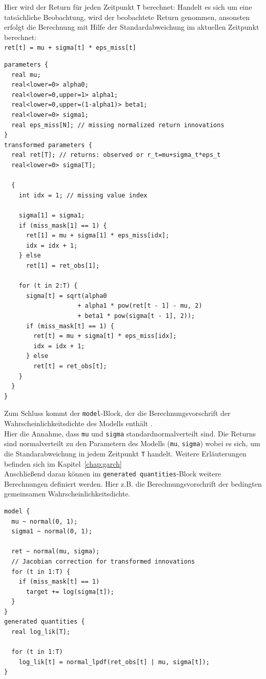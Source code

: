 \documentclass[ngerman]{ttlab-qualify}
\begin{document}
Hier wird der Return für jeden Zeitpunkt \verb|T| berechnet: Handelt es sich um eine tatsächliche Beobachtung, wird der beobachtete Return genommen, ansonsten erfolgt die Berechnung mit Hilfe der Standardabweichung im aktuellen Zeitpunkt berechnet:\\
\verb|ret[t] = mu + sigma[t] * eps_miss[t]|

\begin{lstlisting}[style=custom]
parameters {
  real mu;
  real<lower=0> alpha0;
  real<lower=0,upper=1> alpha1;
  real<lower=0,upper=(1-alpha1)> beta1;
  real<lower=0> sigma1;
  real eps_miss[N]; // missing normalized return innovations
}
transformed parameters {
  real ret[T]; // returns: observed or r_t=mu+sigma_t*eps_t
  real<lower=0> sigma[T];

  {
    int idx = 1; // missing value index

    sigma[1] = sigma1;
    if (miss_mask[1] == 1) {
      ret[1] = mu + sigma[1] * eps_miss[idx];
      idx = idx + 1;
    } else
      ret[1] = ret_obs[1];

    for (t in 2:T) {
      sigma[t] = sqrt(alpha0
                    + alpha1 * pow(ret[t - 1] - mu, 2)
                    + beta1 * pow(sigma[t - 1], 2));
      if (miss_mask[t] == 1) {
        ret[t] = mu + sigma[t] * eps_miss[idx];
        idx = idx + 1;
      } else
        ret[t] = ret_obs[t];
    }
  }
}
\end{lstlisting}

Zum Schluss kommt der \verb|model|-Block, der die Berechnungsvorschrift der Wahrscheinlichkeitsdichte des Modells enthält \parencite{stan:2017}.\\
Hier die Annahme, dass \verb|mu| und \verb|sigma| standardnormalverteilt sind. Die Returns sind normalverteilt zu den Parametern des Modells (\verb|mu|, \verb|sigma|) wobei es sich, um die Standarabweichung in jedem Zeitpunkt \verb|T| handelt. Weitere Erläuterungen befinden sich im Kapitel~\ref{chap:garch} \\

Anschließend daran können im \verb|generated quantities|-Block weitere Berechnungen definiert werden. 
Hier z.B. die Berechnungsvorschrift der bedingten gemeinsamen Wahrscheinlichkeitsdichte.

\begin{lstlisting}[style=custom]
model {
  mu ~ normal(0, 1);
  sigma1 ~ normal(0, 1);

  ret ~ normal(mu, sigma);
  // Jacobian correction for transformed innovations
  for (t in 1:T) {
    if (miss_mask[t] == 1)
      target += log(sigma[t]);
  }
}
generated quantities {
  real log_lik[T];

  for (t in 1:T)
    log_lik[t] = normal_lpdf(ret_obs[t] | mu, sigma[t]);
}

\end{lstlisting}
\end{document}
